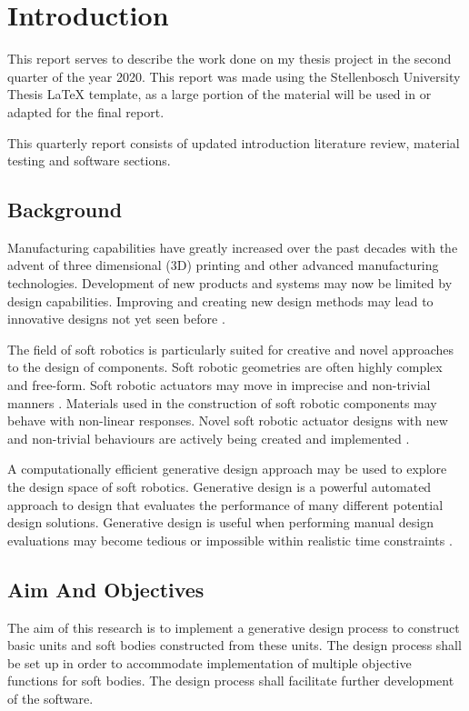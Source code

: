 \chapter{Introduction}
\label{chp:Intro}

This report serves to describe the work done on my thesis project in the second quarter of the year 2020. This report was made using the Stellenbosch University Thesis LaTeX template, as a large portion of the material will be used in or adapted for the final report.

This quarterly report consists of updated introduction literature review, material testing and software sections.

\section{Background}

Manufacturing capabilities have greatly increased over the past decades with the advent of three dimensional (3D) printing and other advanced manufacturing technologies. Development of new products and systems may now be limited by design capabilities. Improving and creating new design methods may lead to innovative designs not yet seen before \cite{Shea2005}.

The field of soft robotics is particularly suited for creative and novel approaches to the design of components. Soft robotic geometries are often highly complex and free-form. Soft robotic actuators may move in imprecise and non-trivial manners \cite{Whitesides2018}. Materials used in the construction of soft robotic components may behave with non-linear responses\cite{Boyraz2018}. Novel soft robotic actuator designs with new and non-trivial behaviours are actively being created and implemented \cite{Ellis2020}.

A computationally efficient generative design approach may be used to explore the design space of soft robotics. Generative design is a powerful automated approach to design that evaluates the performance of many different potential design solutions. Generative design is useful when performing manual design evaluations may become tedious or impossible within realistic time constraints \citep{Brose1993}.

\section{Aim And Objectives}

The aim of this research is to implement a generative design process to construct basic units and soft bodies constructed from these units. The design process shall be set up in order to accommodate implementation of multiple objective functions for soft bodies. The design process shall facilitate further development of the software.